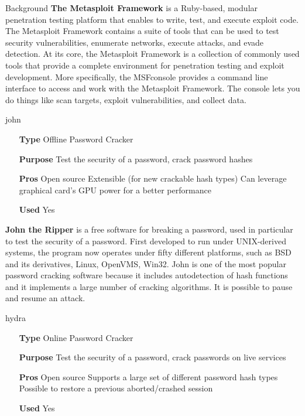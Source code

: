 \begin{chaptercover}{Background}
\textbf{The Metasploit Framework} \cite{metasploit} is a Ruby-based, modular penetration testing platform that enables to write, test, and execute exploit code. The Metasploit Framework contains a suite of tools that can be used to test security vulnerabilities, enumerate networks, execute attacks, and evade detection. At its core, the Metasploit Framework is a collection of commonly used tools that provide a complete environment for penetration testing and exploit development. More specifically, the MSFconsole provides a command line interface to access and work with the Metasploit Framework. The console lets you do things like scan targets, exploit vulnerabilities, and collect data.

\begin{solutiondata}{john}
\begin{itemize}[labelsep=1cm]
  \item [\textbf{Type}] Offline Password Cracker
  \item [\textbf{Purpose}] Test the security of a password, crack password hashes
  \item [\textbf{Pros}] Open source \newline Extensible (for new crackable hash types) \newline Can leverage graphical card's GPU power for a better performance
  \item [\textbf{Used}] Yes
\end{itemize}
\end{solutiondata}

\textbf{John the Ripper} \cite{john} is a free software for breaking a password, used in particular to test the security of a password. First developed to run under UNIX-derived systems, the program now operates under fifty different platforms, such as BSD and its derivatives, Linux, OpenVMS, Win32. John is one of the most popular password cracking software because it includes autodetection of hash functions and it implements a large number of cracking algorithms. It is possible to pause and resume an attack.

\begin{solutiondata}{hydra}
\begin{itemize}[labelsep=1cm]
  \item [\textbf{Type}] Online Password Cracker
  \item [\textbf{Purpose}] Test the security of a password, crack passwords on live services
  \item [\textbf{Pros}] Open source \newline Supports a large set of different password hash types \newline Possible to restore a previous aborted/crashed session
  \item [\textbf{Used}] Yes
\end{itemize}
\end{solutiondata}


\end{chaptercover}

